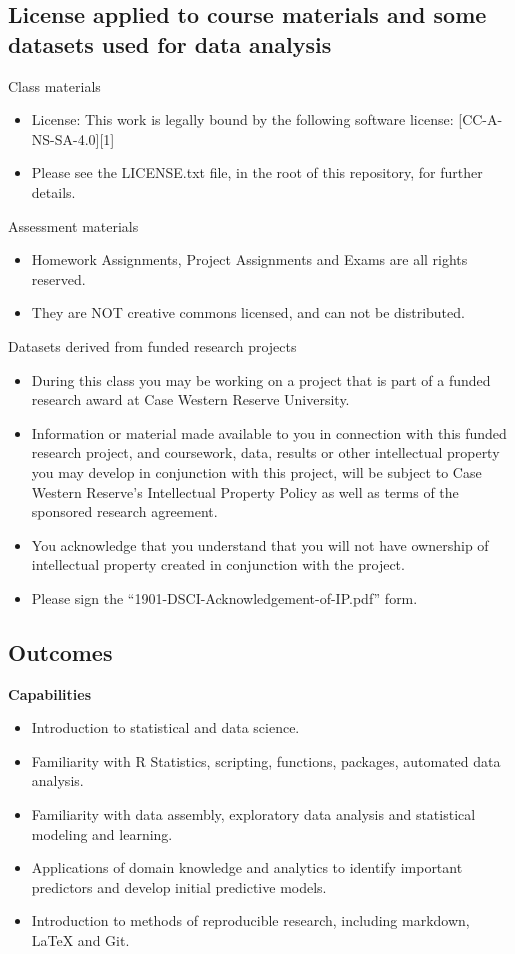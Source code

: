 \documentclass[11pt]{article} %
\begin{document}
\subsection{License applied to course materials and some datasets used for data analysis}

Class materials
\begin{itemize}
  \item License: This work is legally bound by the following software license: [CC-A-NS-SA-4.0][1]  
  \item Please see the LICENSE.txt file, in the root of this repository, for further details.
\end{itemize}

Assessment materials
\begin{itemize}
  \item Homework Assignments, Project Assignments and Exams are all rights reserved. 
  \item They are NOT creative commons licensed, and can not be distributed. 
\end{itemize}

Datasets derived from funded research projects
\begin{itemize}
  \item During this class you may be working on a project that is part of a funded research award at Case Western Reserve University.  
  \item Information or material made available to you in connection with this funded research project, and coursework, data, results or other intellectual property you may develop in conjunction with this project, will be subject to Case Western Reserve’s Intellectual Property Policy as well as terms of the sponsored research agreement.  
  \item You acknowledge that you understand that you will not have ownership of intellectual property created in conjunction with the project.
  \item Please sign the ``1901-DSCI-Acknowledgement-of-IP.pdf'' form. 
\end{itemize}

\subsection{Outcomes}

{\bf Capabilities}
\begin{itemize}
	\item Introduction to statistical and data science. 
	\item Familiarity with R Statistics, scripting, functions, packages, automated data analysis. 
	\item Familiarity with data assembly, exploratory data analysis and statistical modeling and learning. 
	\item Applications of domain knowledge and analytics to identify important predictors and develop initial predictive models. 
	\item Introduction to methods of reproducible research, including markdown, LaTeX and Git. 
\end{itemize}
\end{document}
